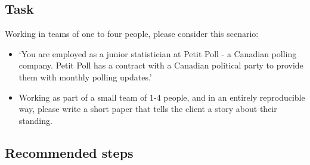 \documentclass[
]{book}
\providecommand{\tightlist}{%
  \setlength{\itemsep}{0pt}\setlength{\parskip}{0pt}}
\begin{document}
\hypertarget{task-4}{%
\subsection{Task}\label{task-4}}

Working in teams of one to four people, please consider this scenario:

\begin{itemize}
\tightlist
\item
  `You are employed as a junior statistician at Petit Poll - a Canadian polling company. Petit Poll has a contract with a Canadian political party to provide them with monthly polling updates.'
\item
  Working as part of a small team of 1-4 people, and in an entirely reproducible way, please write a short paper that tells the client a story about their standing.
\end{itemize}

\hypertarget{recommended-steps}{%
\subsection{Recommended steps}\label{recommended-steps}}
\end{document}
